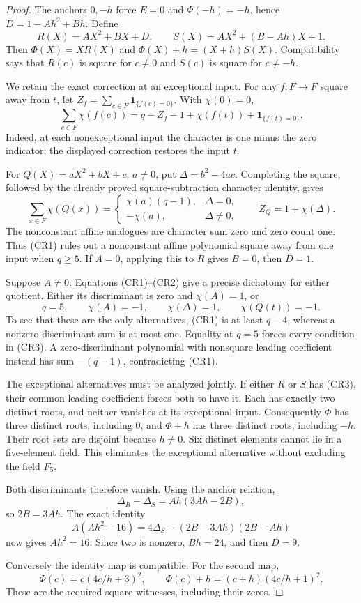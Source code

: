\documentclass[11pt]{article}
\begin{document}
\begin{proof}
The anchors \(0,-h\) force \(E=0\) and \(\Phi(-h)=-h\), hence
\(D=1-Ah^2+Bh\). Define
\[
 R(X)=AX^2+BX+D,\qquad
 S(X)=AX^2+(B-Ah)X+1.
\]
Then \(\Phi(X)=XR(X)\) and
\(\Phi(X)+h=(X+h)S(X)\).
Compatibility says that \(R(c)\) is square for \(c\ne0\) and
\(S(c)\) is square for \(c\ne-h\).

We retain the exact correction at an exceptional input.
For any \(f:F\to F\) square away from \(t\), let
\(Z_f=\sum_{c\in F}\mathbf1_{\{f(c)=0\}}\).
With \(\chi(0)=0\),
\[
 \sum_{c\in F}\chi(f(c))
     =q-Z_f-1+\chi(f(t))+\mathbf1_{\{f(t)=0\}}.       \tag{CR1}
\]
Indeed, at each nonexceptional input the character is one minus
the zero indicator; the displayed correction restores the input \(t\).

For \(Q(X)=aX^2+bX+c\), \(a\ne0\), put
\(\Delta=b^2-4ac\). Completing the square, followed by the
already proved square-subtraction character identity, gives
\[
 \sum_{x\in F}\chi(Q(x))=
 \begin{cases}\chi(a)(q-1),&\Delta=0,\\-\chi(a),&\Delta\ne0,\end{cases}
 \qquad Z_Q=1+\chi(\Delta).                         \tag{CR2}
\]
The nonconstant affine analogues are character sum zero and zero
count one. Thus (CR1) rules out a nonconstant affine polynomial
square away from one input when \(q\ge5\).
If \(A=0\), applying this to \(R\) gives \(B=0\), then \(D=1\).

Suppose \(A\ne0\). Equations (CR1)--(CR2) give a precise dichotomy
for either quotient. Either its discriminant is zero and
\(\chi(A)=1\), or
\[
 q=5,\qquad \chi(A)=-1,\qquad
 \chi(\Delta)=1,\qquad \chi(Q(t))=-1.               \tag{CR3}
\]
To see that these are the only alternatives, (CR1) is at least
\(q-4\), whereas a nonzero-discriminant sum is at most one.
Equality at \(q=5\) forces every condition in (CR3).
A zero-discriminant polynomial with nonsquare leading coefficient
instead has sum \(-(q-1)\), contradicting (CR1).

The exceptional alternatives must be analyzed jointly.
If either \(R\) or \(S\) has (CR3), their common leading coefficient
forces both to have it. Each has exactly two distinct roots, and
neither vanishes at its exceptional input. Consequently
\(\Phi\) has three distinct roots, including \(0\), and
\(\Phi+h\) has three distinct roots, including \(-h\).
Their root sets are disjoint because \(h\ne0\).
Six distinct elements cannot lie in a five-element field.
This eliminates the exceptional alternative without excluding
the field \(F_5\).

Both discriminants therefore vanish. Using the anchor relation,
\[
 \Delta_R-\Delta_S=Ah(3Ah-2B),
\]
so \(2B=3Ah\). The exact identity
\[
 A(Ah^2-16)=
 4\Delta_S-(2B-3Ah)(2B-Ah)
\]
now gives \(Ah^2=16\). Since two is nonzero, \(Bh=24\), and then
\(D=9\).

Conversely the identity map is compatible. For the second map,
\[
 \Phi(c)=c(4c/h+3)^2,\qquad
 \Phi(c)+h=(c+h)(4c/h+1)^2.
\]
These are the required square witnesses, including their zeros.
\end{proof}
\end{document}
